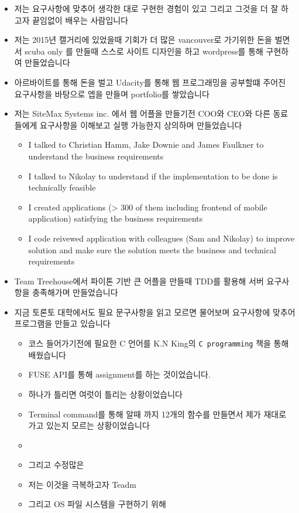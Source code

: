 \documentclass[12pt]{article}
\begin{document}
\begin{itemize}
\begin{itemize}
        \begin{itemize}
            \item 저는 요구사항에 맞추어 생각한 대로 구현한 경험이 있고 그리고 그것을 더 잘 하고자 끝임없이 배우는 사람입니다
            \item 저는 2015년 캘거리에 있었을때 기회가 더 많은 vancouver로 가기위한 돈을 벌면서 scuba only 를 만들때 스스로 사이트 디자인을 하고 wordpress를 통해 구현하여 만들었습니다
            \item 아르바이트를 통해 돈을 벌고 Udacity를 통해 웹 프로그래밍을 공부할떄 주어진 요구사항을 바탕으로 엡을 만들며 portfolio를 쌓았습니다
            \item 저는 SiteMax Systems inc. 에서 웹 어플을 만들기전 COO와 CEO와 다른 동료들에게 요구사항을 이해보고 실행 가능한지 상의하며 만들었습니다
            \begin{itemize}
                \item I talked to Christian Hamm, Jake Downie and James Faulkner to understand the business requirements
                \item I talked to Nikolay to understand if the implementation to be done is technically feasible
                \item I created applications (> 300 of them including frontend of mobile application) satisfying the business requirements
                \item I code reivewed application with colleagues (Sam and Nikolay) to improve solution and make sure the solution meets the business and technical requirements
            \end{itemize}
            \item Team Treehouse에서 파이톤 기반 큰 어플을 만들때 TDD를 활용해 서버 요구사항을 충족해가며 만들었습니다
            \item 지금 토론토 대학에서도 필요 문구사항을 읽고 모르면 물어보며 요구사항에 맞추어 프로그램을 만들고 있습니다
            \begin{itemize}
                \item 코스 들어가기전에 필요한 C 언어를 K.N King의 \texttt{C programming} 책을 통해 배웠습니다
                \item FUSE API를 통해 assignment를 하는 것이었습니다.
                \item 하나가 틀리면 여럿이 틀리는 상황이었습니다
                \item Terminal command를 통해 알때 까지 12개의 함수를 만들면서 제가 재대로 가고 있는지 모르는 상황이었습니다
                \item
                \item 그리고 수정많은
                \item 저는 이것을 극복하고자 Teadm
                \item 그리고 OS 파일 시스템을 구현하기 위해
            \end{itemize}
        \end{itemize}


\end{itemize}
\end{itemize}
\end{document}
